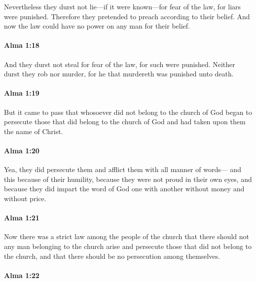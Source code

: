			Nevertheless they durst not lie---if it were known---for fear of the law,
			for liars were punished.
			Therefore they pretended to preach according to their belief.
			And now the law could have no power on any man for their belief.

		\paragraph{Alma 1:18} %
			\label{ALMA-1-18}

			And they durst not steal for fear of the law,
			for such were punished.
			Neither durst they rob nor murder,
			for he that murdereth was punished unto death.

		\paragraph{Alma 1:19} %
			\label{ALMA-1-19}

			But it came to pass that
			whosoever did not belong to the church of God began to persecute those
			that did belong to the church of God and had taken upon them the name of Christ.

		\paragraph{Alma 1:20} %
			\label{ALMA-1-20}

			Yea, they did persecute them and afflict them with all manner of words---
			and this because of their humility,
			because they were not proud in their own eyes,
			and because they did impart the word of God one with another
			without money and without price.

		\paragraph{Alma 1:21} %
			\label{ALMA-1-21}

			Now there was a strict law among the people of the church
			that there should not any man belonging to the church
			arise and persecute those that did not belong to the church,
			and that there should be no persecution among themselves.

		\paragraph{Alma 1:22} %
			\label{ALMA-1-22}

